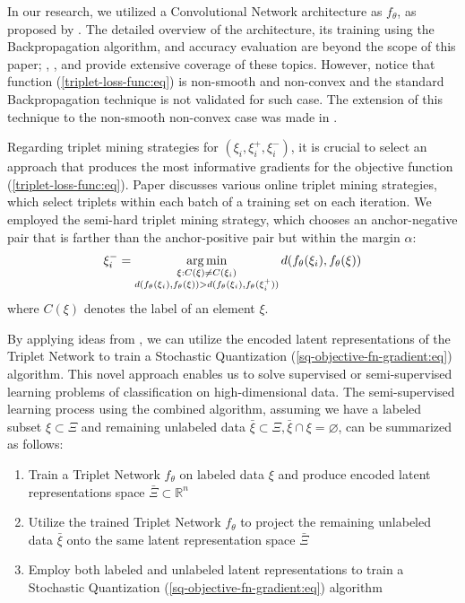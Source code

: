 In our research, we utilized a Convolutional Network architecture as $f_{\theta}$, as proposed by \cite{Lecun_1998}. The detailed overview of the architecture, its training using the Backpropagation algorithm, and accuracy evaluation are beyond the scope of this paper; \cite{Beohar_2021}, \cite{Krizhevsky_2012}, and \cite{Lecun_1998} provide extensive coverage of these topics. However, notice that function (\ref{triplet-loss-func:eq}) is non-smooth and non-convex and the standard Backpropagation technique is not validated for such case. The extension of this technique to the non-smooth non-convex case was made in \cite{Norkin_2021}.

Regarding triplet mining strategies for $(\xi_i, \xi^+_i, \xi^-_i)$, it is crucial to select an approach that produces the most informative gradients for the objective function (\ref{triplet-loss-func:eq}). Paper \cite{xuan2020} discusses various online triplet mining strategies, which select triplets within each batch of a training set on each iteration. We employed the semi-hard triplet mining strategy, which chooses an anchor-negative pair that is farther than the anchor-positive pair but within the margin $\alpha$:
\begin{equation}
    \label{semi-hard-triplet-mining:eq}
    \xi^-_i = \operatorname*{arg\,min}_{\substack{\xi: C(\xi) \neq C(\xi_i) \\ d(f_{\theta}(\xi_i), f_{\theta}(\xi)) > d(f_{\theta}(\xi_i), f_{\theta}(\xi^+_i))}} d(f_{\theta}(\xi_i), f_{\theta}(\xi))
\end{equation}
\noindent where $C(\xi)$ denotes the label of an element $\xi$.

By applying ideas from \cite{Hoffer_2015,MURASAKI_ANDO_SHIMAMURA_2022,Turpault_Serizel_Vincent_2019}, we can utilize the encoded latent representations of the Triplet Network to train a Stochastic Quantization (\ref{sq-objective-fn-gradient:eq}) algorithm. This novel approach enables us to solve supervised or semi-supervised learning problems of classification on high-dimensional data. The semi-supervised learning process using the combined algorithm, assuming we have a labeled subset $\xi \subset \Xi$ and remaining unlabeled data $\bar{\xi} \subset \Xi, \bar{\xi} \cap \xi = \varnothing$, can be summarized as follows:
\begin{enumerate}
    \item Train a Triplet Network $f_{\theta}$ on labeled data $\xi$ and produce encoded latent representations space $\bar{\Xi} \subset \mathbb{R}^n$
    \item Utilize the trained Triplet Network $f_{\theta}$ to project the remaining unlabeled data $\bar{\xi}$ onto the same latent representation space $\bar{\Xi}$
    \item Employ both labeled and unlabeled latent representations to train a Stochastic Quantization (\ref{sq-objective-fn-gradient:eq}) algorithm
\end{enumerate}